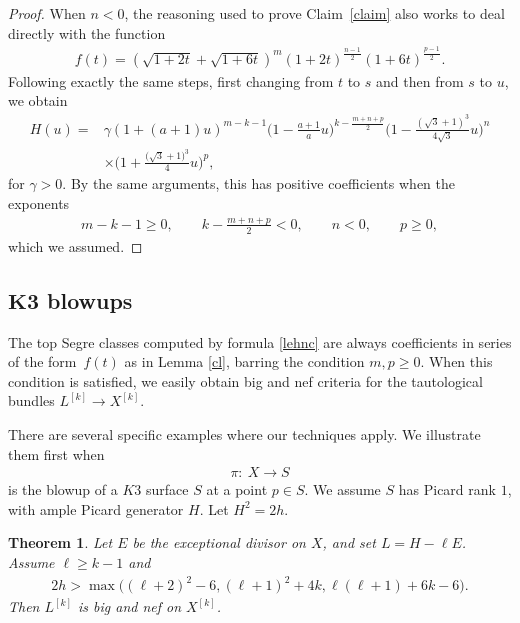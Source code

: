 \documentclass[pdftex]{sigma}
\numberwithin{equation}{section}
\newtheorem{Theorem}{Theorem}[section]
\begin{document}
\begin{proof}
When $n<0$, the reasoning used to prove Claim~\ref{claim} also works to deal directly with the function
\begin{gather*}
f(t)=\left(\sqrt{1+2t}+\sqrt{1+6t}\right)^m {(1+2t)}^{\frac{n-1}{2}} (1+6t)^{\frac{p-1}{2}}.
\end{gather*}
Following exactly the same steps, first changing from $t$ to $s$ and then from $s$ to $u$, we obtain
\begin{align*}
H(u)={}&\gamma (1+(a+1)u)^{m-k-1} \biggl(1-\frac{a+1}{a}u\biggr)^{k-\frac{m+n+p}{2}} \biggl(1-\frac{(\sqrt{3}+1)^3}{4\sqrt{3}}u\biggr)^{n}
\\
&\times \biggl(1+\frac{\big(\sqrt{3}+1\big)^3}{4}u\biggr)^p,
\end{align*}
for $\gamma>0$. By the same arguments, this has positive coefficients when the exponents
\begin{gather*}
m-k-1\geq 0, \qquad k-\frac{m+n+p}{2}<0, \qquad n<0, \qquad p\geq 0,
\end{gather*}
which we assumed.
\end{proof}


\subsection[K3 blowups]{$\boldsymbol{K3}$ blowups}
The top Segre classes computed by formula \eqref{lehnc} are always coefficients in series of the form~$f(t)$ as in Lemma \ref{cl}, barring the condition $m, p\geq 0$. When this condition is satisfied, we easily obtain big and nef criteria for the tautological bundles $L^{[k]}\to X^{[k]}$.

There are several specific examples where our techniques apply. We illustrate them first when
\begin{gather*}
\pi\colon\ X\to S
\end{gather*}
is the blowup of a $K3$ surface $S$ at a point $p\in S$. We assume
$S$ has Picard rank $1$, with ample Picard generator $H$. Let $H^2=2h$.

\begin{Theorem}\label{blok}
Let $E$ be the exceptional divisor on $X$, and set $L=H-\ell E$. Assume $\ell\geq k-1$ and
\begin{gather*}
2h>\max \bigl((\ell+2)^2-6, (\ell+1)^2+4k, \ell(\ell+1)+6k-6\bigr).
\end{gather*}
Then $L^{[k]}$ is big and nef on $X^{[k]}$.
\end{Theorem}
\end{document}
